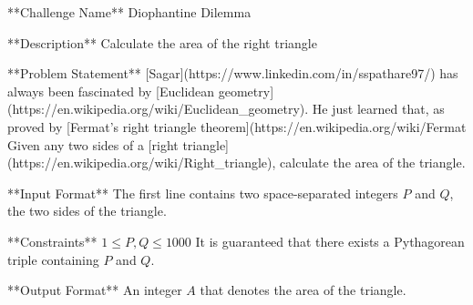 **Challenge Name**  
Diophantine Dilemma

**Description**  
Calculate the area of the right triangle

**Problem Statement**  
[Sagar](https://www.linkedin.com/in/sspathare97/) has always been fascinated by [Euclidean geometry](https://en.wikipedia.org/wiki/Euclidean_geometry). He just learned that, as proved by [Fermat's right triangle theorem](https://en.wikipedia.org/wiki/Fermat%
Given any two sides of a [right triangle](https://en.wikipedia.org/wiki/Right_triangle), calculate the area of the triangle. 

**Input Format**  
The first line contains two space-separated integers $P$ and $Q$, the two sides of the triangle.

**Constraints**  
$1 \leq P, Q \leq 1000$  
It is guaranteed that there exists a Pythagorean triple containing $P$ and $Q$.

**Output Format**  
An integer $A$ that denotes the area of the triangle.